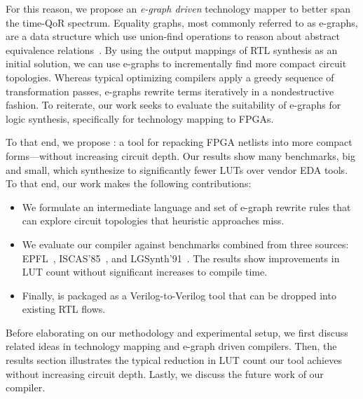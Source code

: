For this reason, we propose an \textit{e-graph driven} technology mapper to
better span the time-QoR spectrum. Equality graphs, most commonly referred to
as e-graphs, are a data structure which use union-find operations to reason
about abstract equivalence relations~\cite{eggpaper}. By using the output
mappings of RTL synthesis as an initial solution, we can use e-graphs to
incrementally find more compact circuit topologies. Whereas typical optimizing
compilers apply a greedy sequence of transformation passes, e-graphs rewrite
terms iteratively in a nondestructive fashion. To reiterate, our work seeks to
evaluate the suitability of e-graphs for logic synthesis, specifically for
technology mapping to FPGAs.

To that end, we propose \shortname{}: a tool for repacking FPGA netlists into
more compact forms---without increasing circuit depth. Our results show many
benchmarks, big and small, which synthesize to significantly fewer LUTs over
vendor EDA tools. To that end, our work makes the following contributions:

\begin{itemize}
    \item We formulate an intermediate language and set of e-graph rewrite rules that can
          explore circuit topologies that heuristic approaches miss.
    \item We evaluate our compiler against \nbenchmarks{} benchmarks combined from three
          sources: EPFL~\cite{epflbench}, ISCAS'85~\cite{iscasbench}, and
          LGSynth'91~\cite{lgsynthbench}. The results show improvements in LUT count
          without significant increases to compile time.
    \item Finally, \shortname{} is packaged as a Verilog-to-Verilog tool that can be
          dropped into existing RTL flows.
\end{itemize}

Before elaborating on our methodology and experimental setup, we first discuss
related ideas in technology mapping and e-graph driven compilers. Then, the
results section illustrates the typical reduction in LUT count our tool
achieves without increasing circuit depth. Lastly, we discuss the future work
of our compiler.